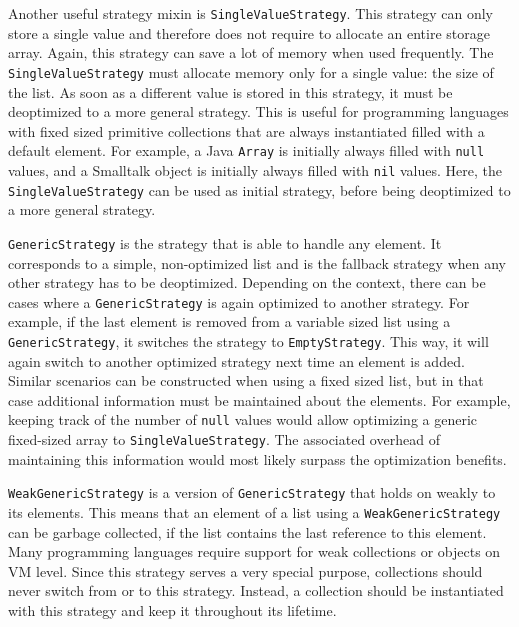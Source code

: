 Another useful strategy mixin is \lstinline{SingleValueStrategy}.
This strategy can only store a single value and therefore does not require to allocate an entire storage array.
Again, this strategy can save a lot of memory when used frequently.
The \lstinline{SingleValueStrategy} must allocate memory only for a single value: the size of the list.
As soon as a different value is stored in this strategy, it must be deoptimized to a more general strategy.
This is useful for programming languages with fixed sized primitive collections that are always instantiated filled with a default element.
For example, a Java \lstinline{Array} is initially always filled with \lstinline{null} values, and a Smalltalk object is initially always filled with \lstinline{nil} values.
Here, the \lstinline{SingleValueStrategy} can be used as initial strategy, before being deoptimized to a more general strategy.

\lstinline{GenericStrategy} is the strategy that is able to handle any element.
It corresponds to a simple, non-optimized list and is the fallback strategy when any other strategy has to be deoptimized.
Depending on the context, there can be cases where a \lstinline{GenericStrategy} is again optimized to another strategy.
For example, if the last element is removed from a variable sized list using a \lstinline{GenericStrategy}, it switches the strategy to \lstinline{EmptyStrategy}.
This way, it will again switch to another optimized strategy next time an element is added.
Similar scenarios can be constructed when using a fixed sized list, but in that case additional information must be maintained about the elements.
For example, keeping track of the number of \lstinline{null} values would allow optimizing a generic fixed-sized array to \lstinline{SingleValueStrategy}.
The associated overhead of maintaining this information would most likely surpass the optimization benefits.

\lstinline{WeakGenericStrategy} is a version of \lstinline{GenericStrategy} that holds on weakly to its elements.
This means that an element of a list using a \lstinline{WeakGenericStrategy} can be garbage collected, if the list contains the last reference to this element.
Many programming languages require support for weak collections or objects on VM level.
Since this strategy serves a very special purpose, collections should never switch from or to this strategy.
Instead, a collection should be instantiated with this strategy and keep it throughout its lifetime.

